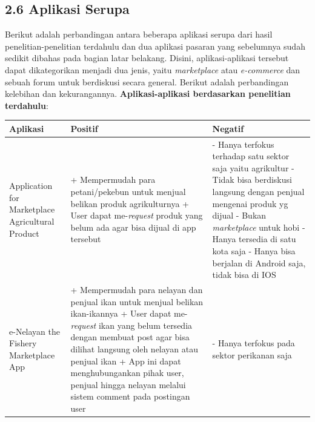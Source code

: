 \documentclass[a4paper]{article}
\begin{document}
\subsection*{2.6 Aplikasi Serupa}
Berikut adalah perbandingan antara beberapa aplikasi serupa dari hasil penelitian-penelitian terdahulu dan dua aplikasi pasaran yang sebelumnya sudah sedikit dibahas pada bagian latar belakang. Disini, aplikasi-aplikasi tersebut dapat dikategorikan menjadi dua jenis, yaitu \textit{marketplace} atau \textit{e-commerce} dan sebuah forum untuk berdiskusi secara general. Berikut adalah perbandingan kelebihan dan kekurangannya.
\textbf{Aplikasi-aplikasi berdasarkan penelitian terdahulu}:
\begin{longtable}{|p{3cm}|p{5cm}|p{5cm}|}
    \hline
    Aplikasi & Positif                                                                                                                 & Negatif \\
    \hline
    Application for Marketplace Agricultural Product
             & + Mempermudah para petani/pekebun untuk menjual belikan produk agrikulturnya \newline
    + User dapat me-\textit{request} produk yang belum ada agar bisa dijual di app tersebut \newline
             & - Hanya terfokus terhadap satu sektor saja yaitu agrikultur \newline
    - Tidak bisa berdiskusi langsung dengan penjual mengenai produk yg dijual \newline
    - Bukan \textit{marketplace} untuk hobi \newline
    - Hanya tersedia di satu kota saja \newline
    - Hanya bisa berjalan di Android saja, tidak bisa di IOS                                                                                     \\
    \hline
    e-Nelayan the Fishery Marketplace App
             & + Mempermudah para nelayan dan penjual ikan untuk menjual belikan ikan-ikannya \newline
    + User dapat me-\textit{request} ikan yang belum tersedia dengan membuat post agar bisa dilihat langsung oleh nelayan atau penjual ikan \newline
    + App ini dapat menghubungankan pihak user, penjual hingga nelayan melalui sistem comment pada postingan user \newline
             & - Hanya terfokus pada sektor perikanan saja \newline

\end{longtable}
\end{document}
